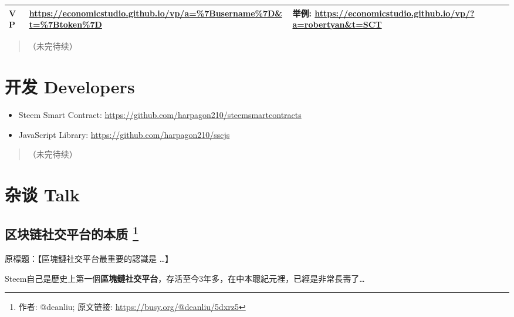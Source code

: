 \documentclass[]{ctexbook}
\providecommand{\tightlist}{%
  \setlength{\itemsep}{0pt}\setlength{\parskip}{0pt}}
\begin{document}
\begin{longtable}[]{@{}lll@{}}
\begin{minipage}[t]{0.30\columnwidth}\raggedright
VP\strut
\end{minipage} & \begin{minipage}[t]{0.30\columnwidth}\raggedright
\url{https://economicstudio.github.io/vp/a=\%7Busername\%7D\&t=\%7Btoken\%7D}\strut
\end{minipage} & \begin{minipage}[t]{0.30\columnwidth}\raggedright
举例: \url{https://economicstudio.github.io/vp/?a=robertyan\&t=SCT}\strut
\end{minipage}\tabularnewline
\bottomrule
\end{longtable}

\begin{quote}
（未完待续）
\end{quote}

\hypertarget{developer}{%
\chapter{开发 Developers}\label{developer}}

\begin{itemize}
\tightlist
\item
  Steem Smart Contract: \url{https://github.com/harpagon210/steemsmartcontracts}
\item
  JavaScript Library: \url{https://github.com/harpagon210/sscjs}
\end{itemize}

\begin{quote}
（未完待续）
\end{quote}

\hypertarget{talk}{%
\chapter{杂谈 Talk}\label{talk}}

\hypertarget{steem-nature}{%
\section[区块链社交平台的本质 ]{\texorpdfstring{区块链社交平台的本质 \footnote{作者: @deanliu; 原文链接: \url{https://busy.org/@deanliu/5dxrz5}}}{区块链社交平台的本质 }}\label{steem-nature}}

原標題：【區塊鏈社交平台最重要的認識是 \ldots{}】

Steem自己是歷史上第一個\textbf{區塊鏈社交平台}，存活至今3年多，在中本聰紀元裡，已經是非常長壽了\ldots{}
\end{document}
